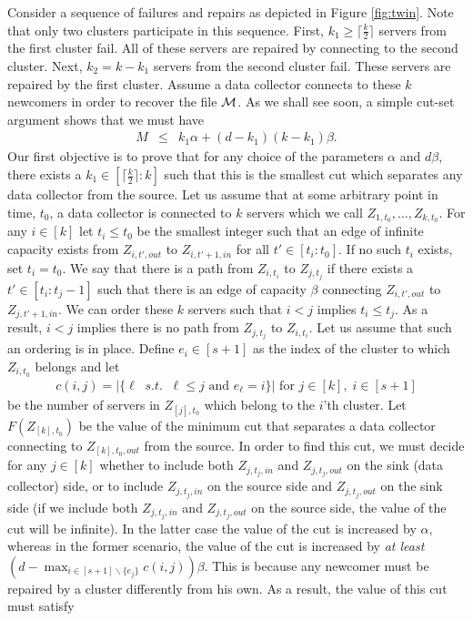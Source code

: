 \documentclass[journal,onecolumn,draftcls]{IEEEtran}
\begin{document}
Consider a sequence of failures and repairs as depicted in Figure \ref{fig:twin}.  Note that only two clusters participate in this sequence. First, $k_1\ge \lceil\frac{k}{2}\rceil $ servers from the first cluster fail. All of these servers are repaired by connecting to the second cluster. Next, $k_2 = k - k_1$ servers from the second cluster fail. These servers are repaired by the first cluster. Assume a data collector connects to these $k$ newcomers in order to  recover the file ${\cal M}$. As we shall see soon, a simple cut-set argument shows that we must have
\begin{eqnarray*}
M&\le& k_1\alpha + (d-k_1)(k-k_1)\beta.
\end{eqnarray*}
Our first objective is to prove that for any choice of the parameters $\alpha$ and $d\beta$, there exists a $k_1\in [\lceil\frac{k}{2}\rceil:k]$ such that this is the smallest cut which separates any data collector from the source. Let us assume that at some arbitrary point in time, $t_0$, a data collector is connected to $k$ servers which we call $Z_{1,t_0},\dots,Z_{k,t_0}$. For any $i\in[k]$ let $t_i\le t_0$ be the smallest integer such that an edge of infinite capacity exists from $Z_{i,t',out}$ to $Z_{i,t'+1,in}$ for all $t'\in[t_i:t_0]$. If no such $t_i$ exists, set $t_i = t_0$. We say that there is a path from $Z_{i,t_i}$ to $Z_{j,t_j}$ if there exists a $t'\in[t_i:t_j -1]$ such that there is an edge of capacity $\beta$ connecting $Z_{i,t',out}$ to $Z_{j,t'+1,in}$. We can order these $k$ servers such that $i<j$ implies $t_i\le t_j$. As a result, $i < j$ implies there is no path from $Z_{j,t_j}$ to $Z_{i,t_i}$. Let us assume that such an ordering is in place. Define $e_i\in[s+1]$ as the index of the cluster to which $Z_{i,t_0}$ belongs and let
\begin{eqnarray}
c(i,j) = \left|\{\ell \;\; s.t. \;\; \ell\le j \mbox{ and } e_\ell = i\}\right| \mbox{ for } j\in [k],\; i \in [s+1]
\label{eqn:commuli}
\end{eqnarray}
be the number of servers in $Z_{[j],t_0}$ which belong to the $i$'th cluster. Let $F(Z_{[k],t_0})$ be the value of the minimum cut that separates a data collector connecting to $Z_{[k],t_0,out}$ from the source. In order to find this cut, we must decide for any $j\in[k]$ whether to include both $Z_{j,t_j,in}$ and $Z_{j,t_j,out}$ on the sink (data collector) side, or to include $Z_{j,t_j,in}$ on the source side and $Z_{j,t_j,out}$ on the sink side (if we include both $Z_{j,t_j,in}$ and $Z_{j,t_j,out}$ on the source side, the value of the cut will be infinite). In the latter case the value of the cut is increased by $\alpha$, whereas in the former scenario, the value of the cut is increased by {\it at least} $(d - \max_{i\in[s+1]\backslash \{e_j\}} c(i,j))\beta$. This is because any newcomer must be repaired by a cluster differently from his own. As a result, the value of this cut must satisfy
\end{document}
